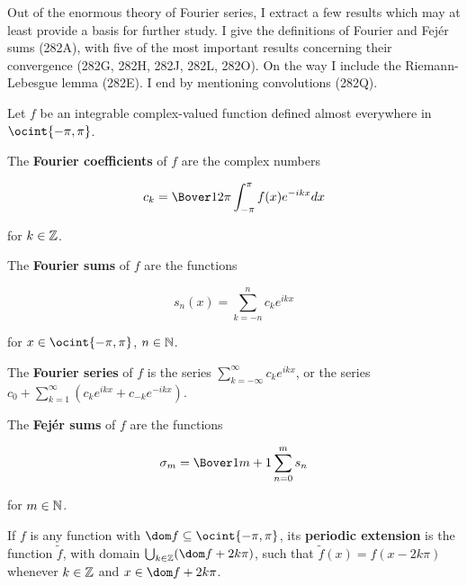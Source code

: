 
\def\chaptername{Fourier analysis}
\def\sectionname{Fourier series}
\def\Var{\mathop{\text{Var}}}


Out of the enormous theory of Fourier series, I extract a few results
which may at least provide a basis for further study.   I give the
definitions of Fourier and Fej\'er sums (282A), with five of the most
important results concerning their convergence (282G, 282H, 282J, 282L,
282O).   On the way I include the Riemann-Lebesgue lemma (282E).   I end
by mentioning convolutions (282Q).

 Let $f$ be an integrable complex-valued
function defined almost everywhere in $\ocint{-\pi,\pi}$.

 The {\bf
Fourier coefficients} of $f$ are the complex numbers

$$c_k=\Bover1{2\pi}\int_{-\pi}^{\pi}f(x)e^{-ikx}dx$$

\noindent for $k\in\Bbb Z$.

 The {\bf Fourier sums} of $f$ are the functions

$$s_n(x)=\sum_{k=-n}^nc_ke^{ikx}$$

\noindent for $x\in\ocint{-\pi,\pi}$, $n\in\Bbb N$.

 The {\bf Fourier
series} of $f$ is the series $\sum_{k=-\infty}^{\infty}c_ke^{ikx}$,
or the series
$c_0+\sum_{k=1}^{\infty}(c_ke^{ikx}+c_{-k}e^{-ikx})$.

 The {\bf Fej\'er sums} of $f$ are the functions

$$\sigma_m=\Bover1{m+1}\sum_{n=0}^ms_n$$

\noindent for $m\in\Bbb N$.

   If $f$ is
any function with $\dom f\subseteq\ocint{-\pi,\pi}$, its {\bf periodic
extension} is the function $\tilde f$, with domain
$\bigcup_{k\in\Bbb Z}(\dom f+2k\pi)$, such that $\tilde f(x)=f(x-2k\pi)$
whenever $k\in\Bbb Z$ and $x\in\dom f+2k\pi$.

